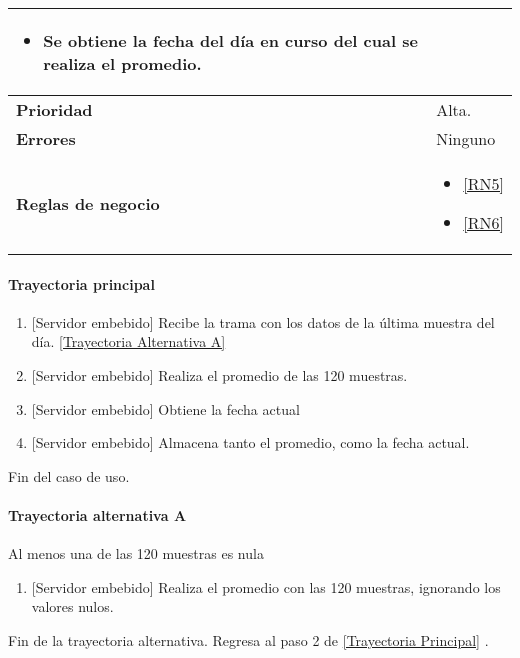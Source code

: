 \begin{longtable}{|J{5cm}|J{10.3cm}|}
\begin{itemize}
			\item Se obtiene la fecha del día en curso del cual se realiza el promedio.
		\end{itemize} \\ \hline 
	\textbf{Prioridad} & 
		Alta. \\ \hline
	\textbf{Errores} & 
	    Ninguno
		\\ \hline
	\textbf{Reglas de negocio} & 
		\begin{itemize}
			\item \ref{RN5}
			\item \ref{RN6}
		\end{itemize} \\ \hline

\end{longtable}

\paragraph{Trayectoria principal}
\label{SUB-M-CU1.1:TP}
	\begin{enumerate}
		\item {[Servidor embebido]} Recibe la trama con los datos de la última muestra del día.
        \hyperref[SUB-M-CU1.1:TA]{[Trayectoria Alternativa A]}
		\item {[Servidor embebido]} Realiza el promedio de las 120 muestras.
		\item {[Servidor embebido]} Obtiene la fecha actual
		\item {[Servidor embebido]} Almacena tanto el promedio, como la fecha actual.
	\end{enumerate}
	Fin del caso de uso.

\paragraph{Trayectoria alternativa A} \label{SUB-M-CU1.1:TA}
	Al menos una de las 120 muestras es nula
	\begin{enumerate}[label=A\arabic*.]
		\item {[Servidor embebido]} Realiza el promedio con las 120 muestras, ignorando los valores nulos.
	\end{enumerate}
	Fin de la trayectoria alternativa. Regresa al paso 2 de \hyperref[SUB-M-CU1.1:TP]{[Trayectoria Principal]} .
